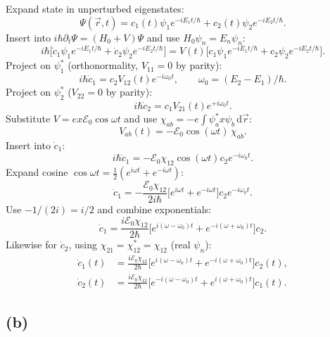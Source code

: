 \documentclass[11pt]{article}
\newcommand{\de}{\mathrm{d}}
\begin{document}
Expand state in unperturbed eigenstates:
\[
\Psi(\vec r,t)=c_1(t)\psi_1 e^{-iE_1 t/\hbar}+c_2(t)\psi_2 e^{-iE_2 t/\hbar}.
\]
Insert into $i\hbar\partial_t\Psi=(H_0+V)\Psi$ and use $H_0\psi_n=E_n\psi_n$:
\[
i\hbar\bigl[\dot c_1\psi_1 e^{-iE_1 t/\hbar}+\dot c_2\psi_2 e^{-iE_2 t/\hbar}\bigr]=V(t)\bigl[c_1\psi_1 e^{-iE_1 t/\hbar}+c_2\psi_2 e^{-iE_2 t/\hbar}\bigr].
\]
Project on $\psi_1^*$ (orthonormality, $V_{11}=0$ by parity):
\[
i\hbar\dot c_1=c_2 V_{12}(t)e^{-i\omega_0 t},\qquad\omega_0=(E_2-E_1)/\hbar.
\]
Project on $\psi_2^*$ ($V_{22}=0$ by parity):
\[
i\hbar\dot c_2=c_1 V_{21}(t)e^{+i\omega_0 t}.
\]
Substitute $V=ex\mathcal E_0\cos\omega t$ and use $\chi_{ab}=-e\!\int\psi_a^* x\psi_b\,\de\vec r$:
\[
V_{ab}(t)=-\mathcal E_0\cos(\omega t)\,\chi_{ab}.
\]
Insert into $\dot c_1$:
\[
i\hbar\dot c_1=-\mathcal E_0\chi_{12}\cos(\omega t)c_2 e^{-i\omega_0 t}.
\]
Expand cosine $\cos\omega t=\tfrac12(e^{i\omega t}+e^{-i\omega t})$:
\[
\dot c_1=-\frac{\mathcal E_0\chi_{12}}{2 i\hbar}\bigl[e^{i\omega t}+e^{-i\omega t}\bigr]c_2 e^{-i\omega_0 t}.
\]
Use $-1/(2i)=i/2$ and combine exponentials:
\[
\dot c_1=\frac{i\mathcal E_0\chi_{12}}{2\hbar}\bigl[e^{i(\omega-\omega_0)t}+e^{-i(\omega+\omega_0)t}\bigr]c_2.
\]
Likewise for $\dot c_2$, using $\chi_{21}=\chi_{12}^*=\chi_{12}$ (real $\psi_n$):
\begin{equation}
\boxed{\;
\begin{aligned}
\dot c_1(t)&=\frac{i\mathcal E_0\chi_{12}}{2\hbar}\bigl[e^{i(\omega-\omega_0)t}+e^{-i(\omega+\omega_0)t}\bigr]c_2(t),\\
\dot c_2(t)&=\frac{i\mathcal E_0\chi_{12}}{2\hbar}\bigl[e^{-i(\omega-\omega_0)t}+e^{i(\omega+\omega_0)t}\bigr]c_1(t).
\end{aligned}\;}\label{eq:coupled}
\end{equation}

\subsection*{(b)}
\end{document}
